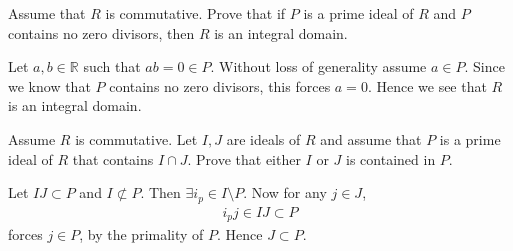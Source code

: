\documentclass[12pt]{exam}
\theoremstyle{plain} %
\theoremstyle{definition} %
\theoremstyle{remark} %
\begin{document}
\begin{questions}
\begin{solution}
  \end{solution}

  \question
  Assume that $R$ is commutative. Prove that if $P$ is a prime ideal
  of $R$ and $P$ contains no zero divisors, then $R$ is an integral domain.
  \begin{solution}
    Let $a, b \in \mathbb{R}$ such that $ab = 0 \in P$. Without loss
    of generality assume $a \in P$. Since we know that $P$
    contains no zero divisors, this forces $a = 0$. Hence we see that
    $R$ is an integral domain.
  \end{solution}

  \question
  Assume $R$ is commutative. Let $I, J$ are ideals of $R$ and assume
  that $P$ is a prime ideal of $R$ that contains $I \cap J$. Prove
  that either $I$ or $J$ is contained in $P$.
  \begin{solution}
    Let $IJ \subset P$ and $I \not \subset P$. Then $\exists
    i_p \in I\setminus P$. Now for any $j \in J$,
    \begin{align*}
      i_pj \in IJ \subset P
    \end{align*}
    forces $j \in P$, by the primality of $P$. Hence $J \subset P$.
  \end{solution}


\end{questions}
\end{document}
